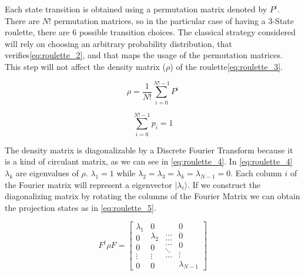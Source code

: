 Each state transition is obtained using a permutation matrix denoted by $P^{i}$. There are $N!$ permutation matrices, so in the particular case of having a $3$-State roulette, there are $6$ possible transition choices. The classical strategy considered will rely on choosing an arbitrary probability distribution, that verifies\ref{eq:roulette_2}, and that maps the usage of the permutation matrices. This step will not affect the density matrix ($\rho$) of the roulette\ref{eq:roulette_3}.

\begin{equation}
\label{eq:roulette_3}
\rho=\frac{1}{N!}\sum_{i=0}^{N!-1}P^{i}
\end{equation}

\begin{equation}
\label{eq:roulette_2}
\sum_{i=0}^{N!-1}p_{i}=1
\end{equation}

The density matrix is diagonalizable by a Discrete Fourier Transform because it is a kind of circulant matrix\cite{Davis1994}, as we can see in \ref{eq:roulette_4}. In \ref{eq:roulette_4} $\lambda_{k}$ are eigenvalues of $\rho$. $\lambda_{1}=1$
while $\lambda_{2}=\lambda_{3}=\lambda_{k}=\lambda_{N-1}=0$. Each column
$i$ of the Fourier matrix will represent a eigenvector $\vert\lambda_{i}\rangle$.
If we construct the diagonalizing matrix by rotating the columns of
the Fourier Matrix we can obtain the projection states as in \ref{eq:roulette_5}.

\begin{equation}
\label{eq:roulette_4}
F^{\dagger}\rho F=\left[\begin{array}{c}
\lambda_{1}\\
0\\
0\\
\vdots\\
0
\end{array}\begin{array}{c}
0\\
\lambda_{2}\\
0\\
\vdots\\
0
\end{array}\begin{array}{c}
\ldots\\
\ldots\\
\ldots\\
\ddots\\
\ldots
\end{array}\begin{array}{c}
0\\
0\\
0\\
\vdots\\
\lambda_{N-1}
\end{array}\right]
\end{equation}



